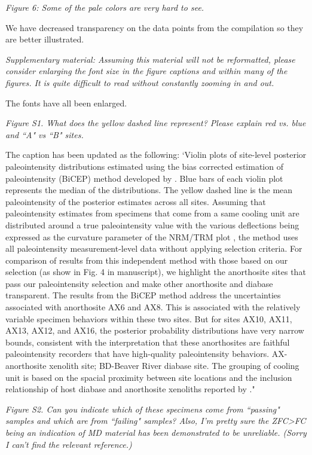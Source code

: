 \documentclass[11pt, letterpaper]{article}
\begin{document}
\begin{flushleft}
\textit{Figure 6: Some of the pale colors are very hard to see.}

We have decreased transparency on the data points from the compilation so they are better illustrated. 

\textit{Supplementary material: Assuming this material will not be reformatted, please consider enlarging the font size in the figure captions and within many of the figures. It is quite difficult to read without constantly zooming in and out.}

The fonts have all been enlarged.

\textit{Figure S1. What does the yellow dashed line represent? Please explain red vs. blue and ``A" vs ``B" sites.}

The caption has been updated as the following: `Violin plots of site-level posterior paleointensity distributions estimated using the bias corrected estimation of paleointensity (BiCEP) method developed by \citealp{Cych2021a}. Blue bars of each violin plot represents the median of the distributions. The yellow dashed line is the mean paleointensity of the posterior estimates across all sites. Assuming that paleointensity estimates from specimens that come from a same cooling unit are distributed around a true paleointensity value with the various deflections being expressed as the curvature parameter of the NRM/TRM plot \cite{Arai1963a, Paterson2011a}, the method uses all paleointensity measurement-level data without applying selection criteria. For comparison of results from this independent method with those based on our selection (as show in Fig. 4 in manuscript), we highlight the anorthosite sites that pass our paleointensity selection and make other anorthosite and diabase transparent. The results from the BiCEP method address the uncertainties associated with anorthosite AX6 and AX8. This is associated with the relatively variable specimen behaviors within these two sites. But for sites AX10, AX11, AX13, AX12, and AX16, the posterior probability distributions have very narrow bounds, consistent with the interpretation that these anorthosites are faithful paleointensity recorders that have high-quality paleointensity behaviors. AX-anorthosite xenolith site; BD-Beaver River diabase site. The grouping of cooling unit is based on the spacial proximity between site locations and the inclusion relationship of host diabase and anorthosite xenoliths reported by \citealp{Zhang2021b}."

\textit{Figure S2. Can you indicate which of these specimens come from ``passing" samples and which are from ``failing" samples? Also, I'm pretty sure the ZFC>FC being an indication of MD material has been demonstrated to be unreliable. (Sorry I can't find the relevant reference.)}


\end{flushleft}
\end{document}
